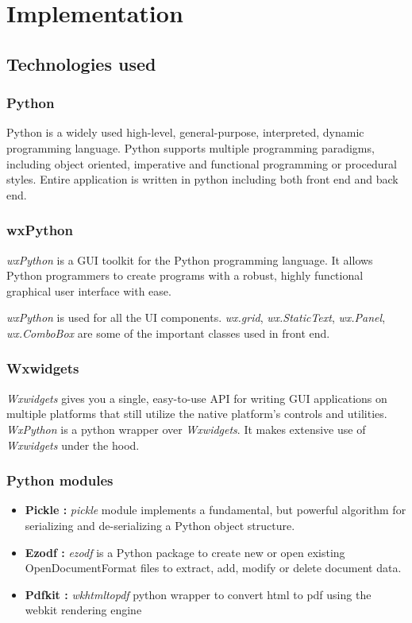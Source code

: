 %

\chapter{Implementation}
\section{Technologies used}
\subsection{Python} 
Python is a widely used high-level, general-purpose, interpreted, dynamic programming language. Python supports multiple programming paradigms, including object oriented, imperative and functional programming or procedural styles.
Entire application is written in python including both front end and back end. 
\subsection{wxPython}
\textit{wxPython} is a GUI toolkit for the Python programming language. It allows Python programmers to create programs with a robust, highly functional graphical user interface with ease. 

\textit{wxPython} is used for all the UI components. \textit{wx.grid}, \textit{wx.StaticText}, \textit{wx.Panel}, \textit{wx.ComboBox} are some of the important classes used in front end.
\subsection{Wxwidgets}
\textit{Wxwidgets} gives you a single, easy-to-use API for writing GUI applications on multiple platforms that still utilize the native platform's controls and utilities.
\textit{WxPython} is a python wrapper over \textit{Wxwidgets}. It makes extensive use of \textit{Wxwidgets} under the hood.
\subsection{Python modules}
\begin{itemize}
\item {\bfseries Pickle :} \textit{pickle} module implements a fundamental, but powerful algorithm for serializing and de-serializing a Python object structure.
\item {\bfseries Ezodf :} \textit{ezodf} is a Python package to create new or open existing OpenDocumentFormat files to extract, add, modify or delete document data.
\item {\bfseries Pdfkit :} \textit{wkhtmltopdf} python wrapper to convert html to pdf using the webkit rendering engine
\end{itemize}


